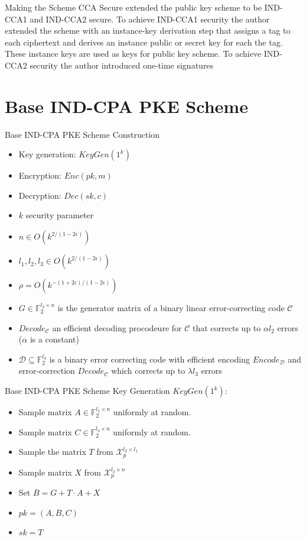 \documentclass{beamer}
\begin{document}
\begin{frame}{Making the Scheme CCA Secure}
  \cite{CCA} extended the public key scheme to be IND-CCA1 and IND-CCA2 secure.
  To achieve IND-CCA1 security the author extended the scheme with an instance-key derivation step that assigns a tag to each ciphertext and derives an instance public or secret key for each the tag.
  These instance keys are used as keys for public key scheme.
  To achieve IND-CCA2 security the author introduced one-time signatures
\end{frame}

\section{Base IND-CPA PKE Scheme}

\begin{frame}{Base IND-CPA PKE Scheme Construction}
  \begin{itemize}
    \item Key generation: $KeyGen(1^k)$
    \item Encryption: $Enc(pk, m)$
    \item Decryption: $Dec(sk, c)$
    \item $k$ security parameter
    \item $n \in O(k^{2/(1-2 \epsilon )})$
    \item $ l_1, l_2, l_3 \in O(k^{2/(1-2 \epsilon)})$
    \item $ \rho = O(k^{-(1+2 \epsilon)/(1-2 \epsilon)}) $
    \item $G \in \mathbb{F}_2^{l_2 \times n}$ is the generator matrix of a binary linear error-correcting code $\mathcal{C}$
    \item $Decode_{\mathcal{C}}$ an efficient decoding procodeure for $\mathcal{C}$ that corrects up to $ \alpha l_2 $ errors ($\alpha$ is a constant)
    \item $ \mathcal{D} \subseteq \mathbb{F}^{l_3}_2 $ is a binary error correcting code with efficient encoding $Encode_{\mathcal{D}}$ and error-correction $Decode_{\mathcal{C}}$ which corrects up to $\lambda l_3$ errors

  \end{itemize}
\end{frame}

\begin{frame}{Base IND-CPA PKE Scheme Key Generation}
  $KeyGen(1^k)$:
  \begin{itemize}
    \item Sample matrix $ A \in \mathbb{F}_2^{l_1 \times n}$ uniformly at random.
    \item Sample matrix $ C \in \mathbb{F}_2^{l_3 \times n} $ uniformly at random.
    \item Sample the matrix $T$ from $ \mathcal{X}_p^{l_2 \times l_1} $
    \item Sample matrix $X$ from $\mathcal{X}_p^{l_2 \times n}$
    \item Set $B = G + T \cdot A + X$
    \item $pk = (A, B, C)$
    \item $sk = T$
  \end{itemize}
\end{frame}
\end{document}
